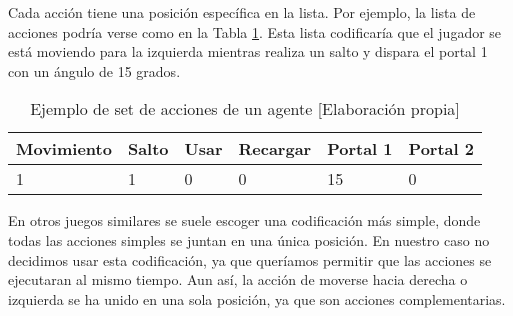Cada acción tiene una posición específica en la lista. Por ejemplo, la lista de acciones podría verse como en la Tabla \ref {tab:accion}. Esta lista codificaría que el jugador se está moviendo para la izquierda mientras realiza un salto y dispara el portal 1 con un ángulo de 15 grados.
\begin{table}[h]
	\begin{center}
		\begin{tabular}{| l | l | l | l | l | l |}
			\hline
			\textbf{Movimiento} & \textbf{Salto} & \textbf{Usar} & \textbf{Recargar} & \textbf{Portal 1} & \textbf{Portal 2} \\ \hline
			1                   & 1              & 0             & 0                 & 15                & 0                 \\ \hline
		\end{tabular}
		\caption{Ejemplo de set de acciones de un agente [Elaboración propia]}
		\label{tab:accion}
	\end{center}
\end{table}


En otros juegos similares se suele escoger una codificación más simple, donde todas las acciones simples se juntan en una única posición. En nuestro caso no decidimos usar esta codificación, ya que queríamos permitir que las acciones se ejecutaran al mismo tiempo. Aun así, la acción de moverse hacia derecha o izquierda se ha unido en una sola posición, ya que son acciones complementarias.